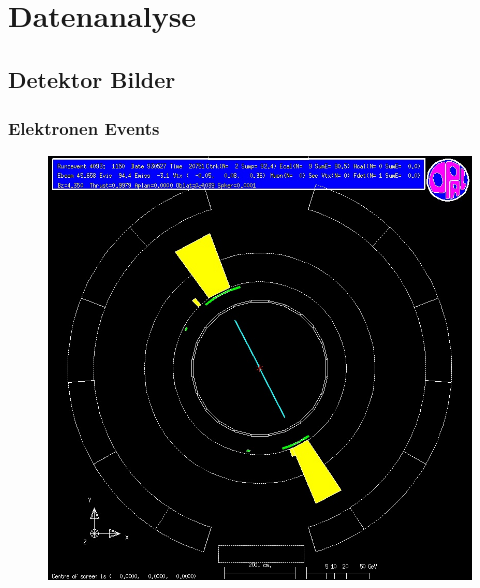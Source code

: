 \section{Datenanalyse}
\subsection{Detektor Bilder}
\begin{frame}
	\frametitle{Elektronen Events}
	\begin{figure}
		\centering
		\includegraphics[width=0.63\linewidth]{graphics/electronopal}
	\end{figure}
\end{frame}

